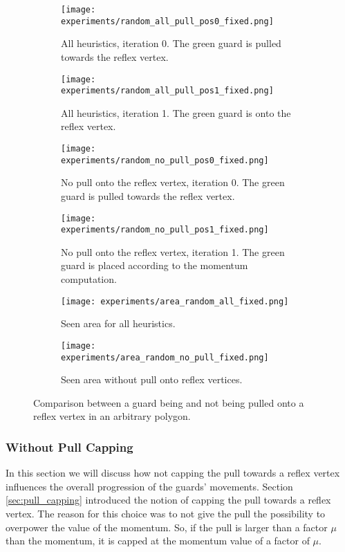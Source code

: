 \begin{figure}[h!]
    \centering
    \begin{subfigure}{0.45\textwidth}
        \texttt{[image: experiments/random\_all\_pull\_pos0\_fixed.png]}
        \caption{All heuristics, iteration 0. The green guard is pulled towards the reflex vertex.}
        \label{fig:all_pull_pos0}
    \end{subfigure}
    \hfill
    \begin{subfigure}{0.45\textwidth}
        \texttt{[image: experiments/random\_all\_pull\_pos1\_fixed.png]}
        \caption{All heuristics, iteration 1. The green guard is onto the reflex vertex.}
        \label{fig:all_pull_pos1}
    \end{subfigure}
    \vfill
    \begin{subfigure}{0.45\textwidth}
        \texttt{[image: experiments/random\_no\_pull\_pos0\_fixed.png]}
        \caption{No pull onto the reflex vertex, iteration 0. The green guard is pulled towards the reflex vertex.}
        \label{fig:no_pull_pos0}
    \end{subfigure}
    \hfill
    \begin{subfigure}{0.45\textwidth}
        \texttt{[image: experiments/random\_no\_pull\_pos1\_fixed.png]}
        \caption{No pull onto the reflex vertex, iteration 1. The green guard is placed according to the momentum computation.}
        \label{fig:no_pull_pos1}
    \end{subfigure}
    \vfill
    \begin{subfigure}{0.45\textwidth}
        \texttt{[image: experiments/area\_random\_all\_fixed.png]}
        \caption{Seen area for all heuristics.}
        \label{fig:area_all_pull}
    \end{subfigure}
    \hfill
    \begin{subfigure}{0.45\textwidth}
        \texttt{[image: experiments/area\_random\_no\_pull\_fixed.png]}
        \caption{Seen area without pull onto reflex vertices.}
        \label{fig:area_no_pull}
    \end{subfigure}
    \caption{Comparison between a guard being and not being pulled onto a reflex vertex in an arbitrary polygon.}
    \label{fig:no_pull}
\end{figure}

\subsubsection{Without Pull Capping}
In this section we will discuss how not capping the pull towards a reflex vertex influences the overall progression of the guards' movements. Section \ref{sec:pull_capping} introduced the notion of capping the pull towards a reflex vertex. The reason for this choice was to not give the pull the possibility to overpower the value of the momentum. So, if the pull is larger than a factor $\mu$ than the momentum, it is capped at the momentum value of a factor of $\mu$. 

